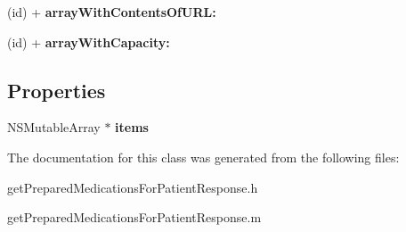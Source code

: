 \begin{DoxyCompactItemize}
\item 
\hypertarget{interfaceget_prepared_medications_for_patient_response_a3e207a66ab5830489041f956e9c0d18e}{}(id) + {\bfseries array\+With\+Contents\+Of\+U\+R\+L\+:}\label{interfaceget_prepared_medications_for_patient_response_a3e207a66ab5830489041f956e9c0d18e}

\item 
\hypertarget{interfaceget_prepared_medications_for_patient_response_a5f92ea37d3c1cf47c551592e03ef5375}{}(id) + {\bfseries array\+With\+Capacity\+:}\label{interfaceget_prepared_medications_for_patient_response_a5f92ea37d3c1cf47c551592e03ef5375}

\end{DoxyCompactItemize}
\subsection*{Properties}
\begin{DoxyCompactItemize}
\item 
\hypertarget{interfaceget_prepared_medications_for_patient_response_a1378685b5df2f24564a44be604214335}{}N\+S\+Mutable\+Array $\ast$ {\bfseries items}\label{interfaceget_prepared_medications_for_patient_response_a1378685b5df2f24564a44be604214335}

\end{DoxyCompactItemize}


The documentation for this class was generated from the following files\+:\begin{DoxyCompactItemize}
\item 
get\+Prepared\+Medications\+For\+Patient\+Response.\+h\item 
get\+Prepared\+Medications\+For\+Patient\+Response.\+m\end{DoxyCompactItemize}
